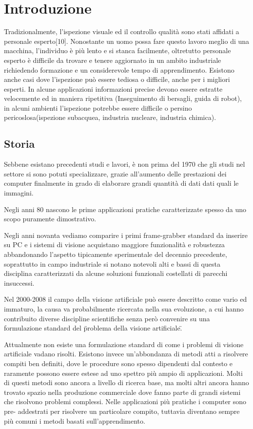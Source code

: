 \chapter{Introduzione}

Tradizionalmente, l'ispezione visuale ed il controllo qualità sono stati
affidati a personale esperto[10]. Nonostante un uomo possa fare questo lavoro
meglio di una macchina, l'individuo è più lento e si stanca facilmente,
oltretutto personale esperto è difficile da trovare e tenere aggiornato in un
ambito industriale richiedendo formazione e un considerevole tempo di
apprendimento. Esistono anche casi dove l'ispezione può essere tediosa o
difficile, anche per i migliori esperti. In alcune applicazioni informazioni
precise devono essere estratte velocemente ed in maniera ripetitiva
(Inseguimento di bersagli, guida di robot), in alcuni ambienti l'ispezione
potrebbe essere difficile o persino pericoslosa(ispezione subacquea, industria
nucleare, industria chimica).

\section{Storia}

Sebbene esistano precedenti studi e lavori, è non prima del 1970 che gli studi
nel settore si sono potuti specializzare, grazie all'aumento delle prestazioni
dei computer finalmente in grado di elaborare grandi quantità di dati dati
quali le immagini.

Negli anni 80 nascono le prime applicazioni pratiche caratterizzate spesso da uno scopo puramente dimostrativo.  

Negli anni novanta vediamo comparire i primi frame-grabber standard da
inserire su PC e i sistemi di visione acquistano maggiore funzionalità e
robustezza abbandonando l'aspetto tipicamente sperimentale del decennio
precedente, soprattutto in campo industriale si notano notevoli alti e bassi
di questa disciplina caratterizzati da alcune soluzioni funzionali costellati
di parecchi insuccessi.

Nel 2000-2008 il campo della visione artificiale può essere descritto come
vario ed immaturo, la causa va probabilmente ricercata nella sua evoluzione, a
cui hanno contribuito diverse discipline scientifiche senza però convenire su
una formulazione standard del \"problema della visione artificiale\".

Attualmente  non esiste una formulazione standard di come i problemi di
visione artificiale vadano risolti. Esistono invece un'abbondanza di metodi
atti a risolvere compiti ben definiti, dove le procedure sono spesso
dipendenti dal contesto e raramente possono essere estese ad uno spettro più
ampio di applicazioni. Molti di questi metodi sono ancora a livello di ricerca
base, ma molti altri ancora hanno trovato spazio nella produzione commerciale
dove fanno parte di grandi sistemi che risolvono problemi complessi. Nelle
applicazioni più pratiche i computer sono pre- addestrati per risolvere un
particolare compito, tuttavia diventano  sempre più comuni i metodi basati
sull'apprendimento.

